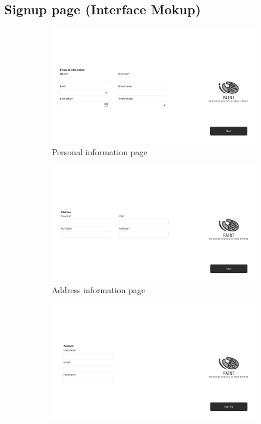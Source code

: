 \subsection{Signup page (Interface Mokup)}
\begin{figure}[H]
    \centering
\begin{subfigure}[b]{0.49\textwidth}
    \centering
    \includegraphics[width=\textwidth]{images/interface_mockups/Landing page - sign up - personal information.pdf}
    \caption{Personal information page}
\end{subfigure}
\begin{subfigure}[b]{0.49\textwidth}
    \centering
    \includegraphics[width=\textwidth]{images/interface_mockups/Landing page - sign up - address information.pdf}
    \caption{Address information page}
\end{subfigure}
\begin{subfigure}[b]{0.49\textwidth}
    \centering
    \includegraphics[width=\textwidth]{images/interface_mockups/Landing page - sign up - account information.pdf}

\end{subfigure}
\end{figure}
